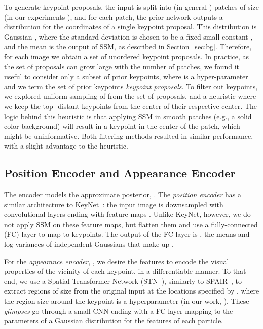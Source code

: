 \documentclass[nohyperref]{article}
\theoremstyle{plain}
\theoremstyle{definition}
\theoremstyle{remark}
\begin{document}
To generate keypoint proposals, 
the input  is split into  (in general ) patches of size  (in our experiments ), and for each patch, the prior network outputs a distribution for the coordinates of a single keypoint proposal. This distribution is Gaussian , where the standard deviation is chosen to be a fixed small constant , and the mean is the output of SSM, as described in Section~\ref{sec:bg}.
Therefore, for each image we obtain a set of  unordered keypoint proposals.
In practice, as the set of proposals can grow large with the number of patches, we found it useful to consider only a subset of  prior keypoints, where  is a hyper-parameter and we term the set of prior keypoints \textit{keypoint proposals}. To filter out  keypoints, we explored uniform sampling of  from the set of  proposals, and a heuristic where we keep the top- distant keypoints from the center of their respective center. The logic behind this heuristic is that applying SSM in smooth patches (e.g., a solid color background) will result in a keypoint in the center of the patch, which might be uninformative. Both filtering methods resulted in similar performance, with a slight advantage to the heuristic. 




\subsection{Position Encoder and Appearance Encoder}
The encoder models the approximate posterior, . The \textit{position encoder}  has a similar architecture to KeyNet~\citep{jakab2018unsupervised}: the input image is downsampled with convolutional layers ending with  feature maps . 
Unlike KeyNet, however, we do not apply SSM on these feature maps, but flatten them and use a fully-connected (FC) layer to map to  keypoints. The output of the FC layer is , the means and log variances of  independent Gaussians that make up .



For the \textit{appearance encoder}, , we desire the features to encode the visual properties of the vicinity of each keypoint, in a differentiable manner.
To that end, we use a Spatial Transformer Network (STN~\citealt{jaderberg2015stn}), similarly to SPAIR~\citep{crawford2019spair}, to extract regions of size  from the original input at the locations specified by , where the region size  around the keypoint is a hyperparameter (in our work, ). These \textit{glimpses} go through 
a small CNN ending with a FC layer mapping to the parameters  of a Gaussian distribution for the features of each particle.
\end{document}
